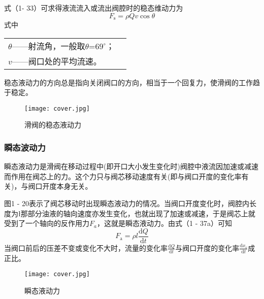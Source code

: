
\noindent 式（1- 33）可求得液流流入或流出阀腔时的稳态维动力为
\begin{equation}
F_\text{s}=\rho Qv\cos \theta
\end{equation}
\noindent 式中\ 
\begin{tabular}[t]{ll}
$\theta$——射流角，一般取$\theta$=$69^{\circ}$；\\
$v$——阀口处的平均流速。
\end{tabular}

稳态液动力的方向总是指向关闭阀口的方向，相当于一个回复力，使滑阀的工作趋于稳定。

\begin{figure}
    \centering
    \ifOpenSource
    \texttt{[image: cover.jpg]}
    \else
    \hspace{10pt}%
    \fi
    \caption{滑阀的稳态液动力}%
    \label{fig:fig0119}
\end{figure}    

\subsubsection*{瞬态波动力}

    瞬态液动力是滑阀在移动过程中(即开口大小发生变化时)阀腔中液流因加速或减速而作用在阀芯上的力。这个力只与阀芯移动速度有关(即与阀口开度的变化率有关)，与阀口开度本身无关。

    图1 - 20表示了阀芯移动时出现瞬态液动力的情况。当阀口开度变化时，阀腔内长度为\l 那部分油液的轴向速度亦发生变化，也就出现了加速或减速，于是阀芯上就受到了一个轴向的反作用力$F_{a}$，这就是瞬态液动力。由式（1 - 37a）可知
\begin{equation*}
F_\text{a}=\rho l \frac{\mathrm{d}Q}{\mathrm{d}t}
\end{equation*}
当阀口前后的压差不变或变化不大时，流量的变化率$\frac{\mathrm{d}Q}{\mathrm{d}t}$与阀口开度的变化率$\frac{\mathrm{d}x_{v}}{\mathrm{d}t}$成正比。

\begin{figure}
    \centering
    \ifOpenSource
    \texttt{[image: cover.jpg]}
    \else
    \hspace{10pt}%
    \fi
    \caption{瞬态液动力}%
    \label{fig:fig0120}
\end{figure}  

